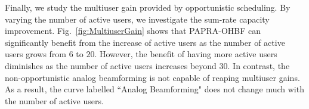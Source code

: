 \documentclass[conference]{IEEEtran}
\begin{document}
Finally, we study the multiuser gain provided by opportunistic scheduling. By varying the number of active users, we investigate the sum-rate capacity improvement. Fig.~\ref{fig:MultiuserGain} shows that PAPRA-OHBF can significantly benefit from the increase of active users as the number of active users grows from $6$ to $20$. However, the benefit of having more active users diminishes as the number of active users increases beyond $30$. In contrast, the non-opportunistic analog beamforming is not capable of reaping multiuser gains. As a result, the curve labelled ``Analog Beamforming" does not change much with the number of active users.	





\end{document}
